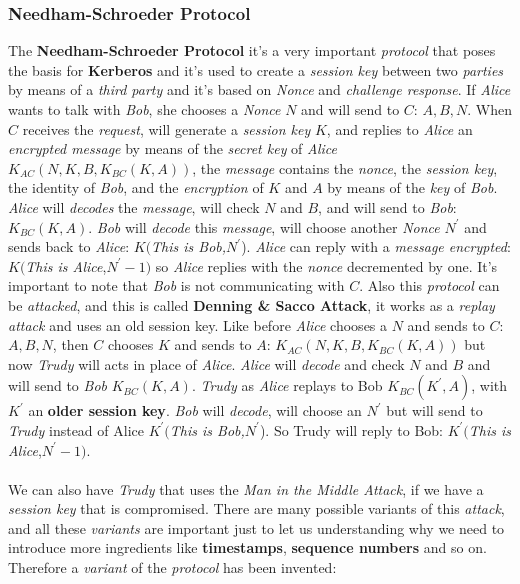 \documentclass{article}
\begin{document}
\subsubsection{Needham-Schroeder Protocol}
The \textbf{Needham-Schroeder Protocol} it's a very important \emph{protocol} that poses the basis for \textbf{Kerberos} and it's used to create a \emph{session key} between two \emph{parties} by means of a \emph{third party} and it's based on \emph{Nonce} and \emph{challenge response}. If \emph{Alice} wants to talk with \emph{Bob}, she chooses a \emph{Nonce} $N$ and will send to $C$: $A,B,N$. When $C$ receives the \emph{request}, will generate a \emph{session key} $K$, and replies to \emph{Alice} an \emph{encrypted message} by means of the \emph{secret key} of \emph{Alice} $K_{AC}(N,K,B,K_{BC}(K,A))$, the \emph{message} contains the \emph{nonce}, the \emph{session key}, the identity of \emph{Bob}, and the \emph{encryption} of $K$ and $A$ by means of the \emph{key} of \emph{Bob}. \emph{Alice} will \emph{decodes} the \emph{message}, will check $N$ and $B$, and will send to \emph{Bob}: $K_{BC}(K,A)$. \emph{Bob} will \emph{decode} this \emph{message}, will choose another \emph{Nonce} $N^{'}$ and sends back to \emph{Alice}: $K($\emph{This is Bob,}$N^{'}$). \emph{Alice} can reply with a \emph{message encrypted}: $K($\emph{This is Alice},$N^{'}-1)$ so \emph{Alice} replies with the \emph{nonce} decremented by one. It's important to note that \emph{Bob} is not communicating with $C$. Also this \emph{protocol} can be \emph{attacked}, and this is called \textbf{Denning \& Sacco Attack}, it works as a \emph{replay attack} and uses an old session key. Like before \emph{Alice} chooses a $N$ and sends to $C$: $A,B,N$, then $C$ chooses $K$ and sends to $A$: $K_{AC}(N,K,B,K_{BC}(K,A))$ but now \emph{Trudy} will acts in place of \emph{Alice}. \emph{Alice} will \emph{decode} and check $N$ and $B$ and will send to \emph{Bob} $K_{BC}(K,A)$. \emph{Trudy} as \emph{Alice} replays to Bob $K_{BC}(K^{'},A)$, with $K^{'}$ an \textbf{older session key}. \emph{Bob} will \emph{decode}, will choose an $N^{'}$ but will send to \emph{Trudy} instead of Alice $K^{'}($\emph{This is Bob,}$N^{'}$). So Trudy will reply to Bob: $K^{'}($\emph{This is Alice},$N^{'}-1)$. \\\\
We can also have \emph{Trudy} that uses the \emph{Man in the Middle Attack}, if we have a \emph{session key} that is compromised. There are many possible variants of this \emph{attack}, and all these \emph{variants} are important just to let us understanding why we need to introduce more ingredients like \textbf{timestamps}, \textbf{sequence numbers} and so on. Therefore a \emph{variant} of the \emph{protocol} has been invented:
\end{document}
